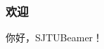 \documentclass[aspectratio=169]{ctexbeamer}
\begin{document}
  \begin{frame}
    \frametitle{欢迎}
    你好，SJTUBeamer！
  \end{frame}
\end{document}
